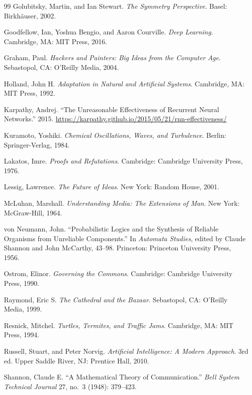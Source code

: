 \documentclass[12pt]{article}
\begin{document}
\begin{thebibliography}{99}
Golubitsky, Martin, and Ian Stewart.
\textit{The Symmetry Perspective}.
Basel: Birkh\"auser, 2002.

Goodfellow, Ian, Yoshua Bengio, and Aaron Courville.
\textit{Deep Learning}.
Cambridge, MA\@: MIT Press, 2016.

Graham, Paul.
\textit{Hackers and Painters: Big Ideas from the Computer Age}.
Sebastopol, CA\@: O'Reilly Media, 2004.

Holland, John H.
\textit{Adaptation in Natural and Artificial Systems}.
Cambridge, MA\@: MIT Press, 1992.

Karpathy, Andrej.
``The Unreasonable Effectiveness of Recurrent Neural Networks.''
2015.
\url{https://karpathy.github.io/2015/05/21/rnn-effectiveness/}

Kuramoto, Yoshiki.
\textit{Chemical Oscillations, Waves, and Turbulence}.
Berlin: Springer-Verlag, 1984.

Lakatos, Imre.
\textit{Proofs and Refutations}.
Cambridge: Cambridge University Press, 1976.

Lessig, Lawrence.
\textit{The Future of Ideas}.
New York: Random House, 2001.

McLuhan, Marshall.
\textit{Understanding Media: The Extensions of Man}.
New York: McGraw-Hill, 1964.

von Neumann, John.
``Probabilistic Logics and the Synthesis of Reliable Organisms from Unreliable
Components.''
In \textit{Automata Studies}, edited by Claude Shannon and John McCarthy,
43--98.
Princeton: Princeton University Press, 1956.

Ostrom, Elinor.
\textit{Governing the Commons}.
Cambridge: Cambridge University Press, 1990.

Raymond, Eric S.
\textit{The Cathedral and the Bazaar}.
Sebastopol, CA\@: O'Reilly Media, 1999.

Resnick, Mitchel.
\textit{Turtles, Termites, and Traffic Jams}.
Cambridge, MA\@: MIT Press, 1994.

Russell, Stuart, and Peter Norvig.
\textit{Artificial Intelligence: A Modern Approach}.
3rd ed.
Upper Saddle River, NJ\@: Prentice Hall, 2010.

Shannon, Claude E.
``A Mathematical Theory of Communication.''
\textit{Bell System Technical Journal} 27, no.~3 (1948): 379--423.


\end{thebibliography}
\end{document}
